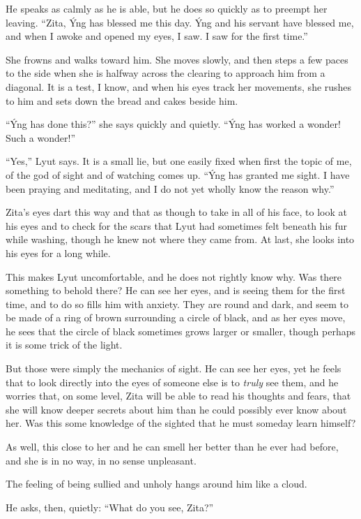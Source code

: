 He speaks as calmly as he is able, but he does so quickly as to preempt her leaving. ``Zita, Ýng has blessed me this day. Ýng and his servant have blessed me, and when I awoke and opened my eyes, I saw. I saw for the first time.''

She frowns and walks toward him. She moves slowly, and then steps a few paces to the side when she is halfway across the clearing to approach him from a diagonal. It is a test, I know, and when his eyes track her movements, she rushes to him and sets down the bread and cakes beside him.

``Ýng has done this?'' she says quickly and quietly. ``Ýng has worked a wonder! Such a wonder!''

``Yes,'' Lyut says. It is a small lie, but one easily fixed when first the topic of me, of the god of sight and of watching comes up. ``Ýng has granted me sight. I have been praying and meditating, and I do not yet wholly know the reason why.''

Zita's eyes dart this way and that as though to take in all of his face, to look at his eyes and to check for the scars that Lyut had sometimes felt beneath his fur while washing, though he knew not where they came from. At last, she looks into his eyes for a long while.

This makes Lyut uncomfortable, and he does not rightly know why. Was there something to behold there? He can see her eyes, and is seeing them for the first time, and to do so fills him with anxiety. They are round and dark, and seem to be made of a ring of brown surrounding a circle of black, and as her eyes move, he sees that the circle of black sometimes grows larger or smaller, though perhaps it is some trick of the light.

But those were simply the mechanics of sight. He can see her eyes, yet he feels that to look directly into the eyes of someone else is to \emph{truly} see them, and he worries that, on some level, Zita will be able to read his thoughts and fears, that she will know deeper secrets about him than he could possibly ever know about her. Was this some knowledge of the sighted that he must someday learn himself?

As well, this close to her and he can smell her better than he ever had before, and she is in no way, in no sense unpleasant.

The feeling of being sullied and unholy hangs around him like a cloud.

He asks, then, quietly: ``What do you see, Zita?''

